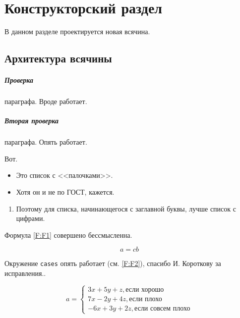 \chapter{Конструкторский раздел}
\label{cha:design}

В данном разделе проектируется новая всячина.

\section{Архитектура всячины}

\paragraph{Проверка} параграфа. Вроде работает.
\paragraph{Вторая проверка} параграфа. Опять работает.

Вот.

\begin{itemize}
    \item Это список с <<палочками>>.
    \item Хотя он и не по ГОСТ, кажется.
\end{itemize}

\begin{enumerate}
    \item Поэтому для списка, начинающегося с заглавной буквы, лучше список с цифрами.
\end{enumerate}

Формула \ref{F:F1} совершено бессмысленна.


\begin{equation}
    a= cb
    \label{F:F1}
\end{equation}


Окружение \texttt{cases} опять работает (см. \ref{F:F2}), спасибо И. Короткову за исправления..


\begin{equation}
    a= \begin{cases}
           3x + 5y + z, \mbox{если хорошо} \\
           7x - 2y + 4z, \mbox{если плохо}\\
           -6x + 3y + 2z, \mbox{если совсем плохо}
    \end{cases}
    \label{F:F2}
\end{equation}

